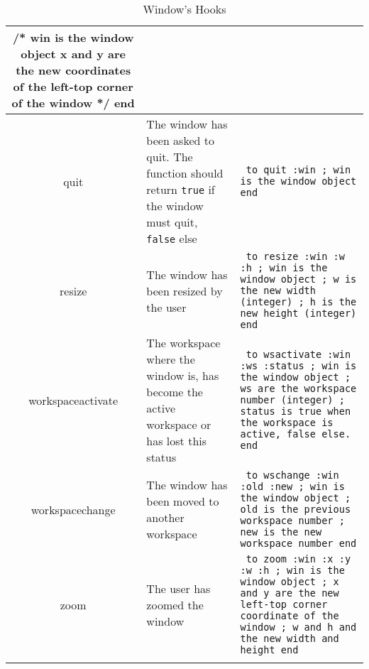 \begin{longtable}{|c|p{4cm}|p{7.5cm}|}
{/* win is the window object\newline
   x and y are the new coordinates\newline 
   of the left-top corner of the window */\newline
end
} \\
\hline
quit\index{Window@\textbf{Window}!Hooks!quit} & The window has been asked to quit. The function should return {\tt true} if the window must quit, {\tt false} else & {\tt
to quit :win\newline
; win is the window object\newline
end
} \\ 
\hline
resize\index{Window@\textbf{Window}!Hooks!resize} & The window has been resized by the user & {\tt
to resize :win :w :h\newline
; win is the window object\newline
; w is the new width (integer)\newline
; h is the new height (integer)\newline
end
} \\
\hline
workspaceactivate\index{Window@\textbf{Window}!Hooks!workspaceactivate} & The workspace where the window is, has become the active workspace or has lost this status & {\tt
to wsactivate :win :ws :status\newline
; win is the window object\newline
; ws are the workspace number (integer)\newline
; status is true when the workspace is active, false else.\newline
end
} \\
\hline
workspacechange\index{Window@\textbf{Window}!Hooks!workspacechange} & The window has been moved to another workspace & {\tt
to wschange :win :old :new\newline
; win is the window object\newline
; old is the previous workspace number\newline
; new is the new workspace number\newline
end
} \\
\hline
zoom\index{Window@\textbf{Window}!Hooks!zoom} & The user has zoomed the window & {\tt
to zoom :win :x :y :w :h\newline
; win is the window object\newline
; x and y are the new left-top corner coordinate of the window\newline
; w and h and the new width and height\newline
end
} \\
\hline
\caption{Window's Hooks}
\end{longtable}
